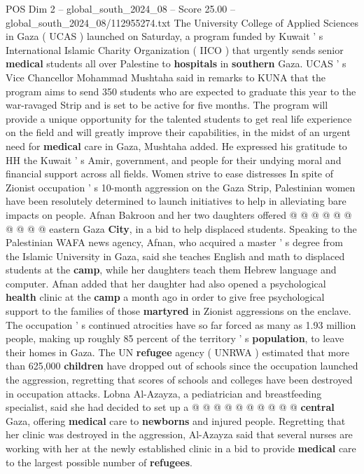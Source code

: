 \begin{textsample}{POS Dim 2 – global\_south\_2024\_08 – Score 25.00 – global\_south\_2024\_08/112955274.txt}  \label{ex:f2_pos_332}
The University College of Applied Sciences in Gaza ( UCAS ) launched on Saturday, a program funded by Kuwait ' s International Islamic Charity Organization ( IICO ) that urgently sends senior \textbf{medical} students all over Palestine to \textbf{hospitals} in \textbf{southern} Gaza.
UCAS ' s Vice Chancellor Mohammad Mushtaha said in remarks to KUNA that the program aims to send 350 students who are expected to graduate this year to the war-ravaged Strip and is set to be active for five months.
The program will provide a unique opportunity for the talented students to get real life experience on the field and will greatly improve their capabilities, in the midst of an urgent need for \textbf{medical} care in Gaza, Mushtaha added.
He expressed his gratitude to HH the Kuwait ' s Amir, government, and people for their undying moral and financial support across all fields.
Women strive to ease distresses In spite of Zionist occupation ' s 10-month aggression on the Gaza Strip, Palestinian women have been resolutely determined to launch initiatives to help in alleviating bare impacts on people.
Afnan Bakroon and her two daughters offered @ @ @ @ @ @ @ @ @ @ eastern Gaza \textbf{City}, in a bid to help displaced students.
Speaking to the Palestinian WAFA news agency, Afnan, who acquired a master ' s degree from the Islamic University in Gaza, said she teaches English and math to displaced students at the \textbf{camp}, while her daughters teach them Hebrew language and computer.
Afnan added that her daughter had also opened a psychological \textbf{health} clinic at the \textbf{camp} a month ago in order to give free psychological support to the families of those \textbf{martyred} in Zionist aggressions on the enclave.
The occupation ' s continued atrocities have so far forced as many as 1.93 million people, making up roughly 85 percent of the territory ' s \textbf{population}, to leave their homes in Gaza.
The UN \textbf{refugee} agency ( UNRWA ) estimated that more than 625,000 \textbf{children} have dropped out of schools since the occupation launched the aggression, regretting that scores of schools and colleges have been destroyed in occupation attacks.
Lobna Al-Azayza, a pediatrician and breastfeeding specialist, said she had decided to set up a @ @ @ @ @ @ @ @ @ @ \textbf{central} Gaza, offering \textbf{medical} care to \textbf{newborns} and injured people.
Regretting that her clinic was destroyed in the aggression, Al-Azayza said that several nurses are working with her at the newly established clinic in a bid to provide \textbf{medical} care to the largest possible number of \textbf{refugees}.

\end{textsample}

